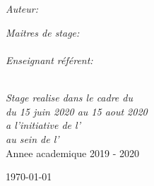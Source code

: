 \documentclass[ 
11pt, %
french, %
singlespacing, %
parskip, %
headsepline, %
openany, %
]{MastersDoctoralThesis} %
\begin{document}
\begin{titlepage}
\begin{center}
\HRule \\[0.4cm] %
{\huge \bfseries \ttitle\par}\vspace{0.4cm} %
\HRule \\[1.5cm] %

\begin{minipage}[t]{0.4\textwidth}
\begin{flushleft} \large
\vspace{7mm}
\emph{Auteur:}\\
\href{http://www.johnsmith.com}{\authorname} %
\end{flushleft}
\end{minipage}
\begin{minipage}[t]{0.4\textwidth}
\begin{flushright} \large
\emph{Maitres de stage:} \\
\href{http://www.jamessmith.com}{\supname} %
\\ \vspace{5mm}
\emph{Enseignant référent:} \\
\href{http://www.jamessmith.com}{\examname} %
\end{flushright}
\end{minipage}\\[2cm]


\large \textit{Stage realise dans le cadre du \degreename}\\[0.2cm] %
\textit{du 15 juin 2020 au 15 aout 2020}\\[0.2cm]
\textit{a l'initiative de l'\groupname}\\[0.2cm] %
\textit{au sein de l'\deptname}\\[2cm] %

\large Annee academique 2019 - 2020

\vfill

{\large \today}\\[4cm] %

\end{center}
\end{titlepage}
\end{document}
